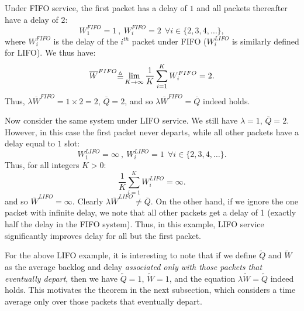 \documentclass[journal]{IEEEtran}
\newcommand{\defequiv}{\mbox{\raisebox{-.3ex}{$\overset{\vartriangle}{=}$}}}
\begin{document}
Under FIFO service, 
the first packet has a delay of $1$ and all packets thereafter have a delay of $2$:
\[ W_1^{FIFO} = 1 \: , \: W_i^{FIFO} = 2 \: \: \forall i \in \{2, 3, 4, \ldots\}, \]
where $W_i^{FIFO}$ is the delay of the $i^{th}$ packet under FIFO ($W_i^{LIFO}$ is similarly defined for LIFO). 
We thus have: 
\[ \overline{W}^{FIFO} \defequiv \lim_{K\rightarrow\infty} \frac{1}{K}\sum_{i=1}^KW_i^{FIFO} = 2. \]
Thus,  $\lambda \overline{W}^{FIFO} = 1\times 2 = 2$, $\overline{Q} = 2$, and so $\lambda\overline{W}^{FIFO} = \overline{Q}$
indeed holds. 

Now consider the same system under LIFO service.  We still have $\lambda =1$, $\overline{Q}=2$. 
However, in this case the first packet never departs, while all other packets have a
delay equal to $1$ slot: 
\[ W_1^{LIFO} = \infty \: , \: W_i^{LIFO} = 1 \: \: \forall i \in \{2, 3, 4, \ldots\}. \]
Thus, for all integers $K>0$: 
\[ \frac{1}{K}\sum_{i=1}^K W_i^{LIFO} = \infty. \]
and so $\overline{W}^{LIFO} = \infty$.  Clearly $\lambda \overline{W}^{LIFO} \neq \overline{Q}$. %
 On the other hand, if we 
ignore the one packet with infinite delay, we note that all other packets get a delay of 1 (exactly half the delay in the FIFO
system).  Thus, in this example, LIFO service  significantly improves delay for all but the first packet. 

For the above LIFO example, it is interesting to note that
if we define $\tilde{Q}$ and $\tilde{W}$ as the average backlog and delay
\emph{associated only with those packets that eventually depart}, then we have $\tilde{Q} = 1$, $\tilde{W}=1$, and the
equation $\lambda \tilde{W} = \tilde{Q}$ indeed holds.  This motivates the theorem in the next subsection,   which 
considers a time average only over those packets that eventually depart. 

\vspace{-.1in}
\end{document}
